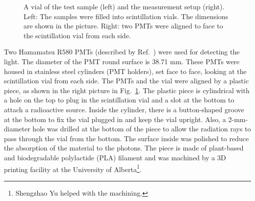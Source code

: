 \begin{figure}[htbp]
	\caption[A vial of the test sample and the measurement setup.]{A vial of the test sample (left) and the measurement setup (right). Left: The samples were filled into scintillation vials. The dimensions are shown in the picture. Right: two PMTs were aligned to face to the scintillation vial from each side.\label{scintVial}}
\end{figure}

Two Hamamatsu R580 PMTs (described by Ref.~\cite{pmtR580}) were used for detecting the light. The diameter of the PMT round surface is 38.71 mm. These PMTs were housed in stainless steel cylinders (PMT holders), set face to face, looking at the scintillation vial from each side. The PMTs and the vial were aligned by a plastic piece, as shown in the right picture in Fig.~\ref{scintVial}.  The plastic piece is cylindrical with a hole on the top to plug in the scintillation vial and a slot at the bottom to attach a radioactive source. Inside the cylinder, there is a button-shaped groove at the bottom to fix the vial plugged in and keep the vial upright. Also, a 2-mm-diameter hole was drilled at the bottom of the piece to allow the radiation rays to pass through the vial from the bottom. The surface inside was polished to reduce the absorption of the material to the photons. The piece is made of plant-based and biodegradable polylactide (PLA) filament and was machined by a 3D printing facility at the University of Alberta\footnote{Shengzhao Yu helped with the machining.}.

